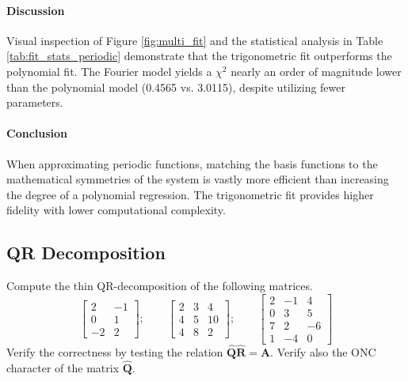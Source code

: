 \begin{solution}
	\paragraph{Discussion}
	Visual inspection of Figure \ref{fig:multi_fit} and the statistical analysis
	in Table \ref{tab:fit_stats_periodic} demonstrate that the trigonometric fit
	outperforms the polynomial fit. The Fourier model yields a $\chi^2$ nearly an
	order of magnitude lower than the polynomial model (0.4565 vs. 3.0115), despite
	utilizing fewer parameters.

	\paragraph{Conclusion}
	When approximating periodic functions, matching the basis functions to the
	mathematical symmetries of the system is vastly more efficient than increasing
	the degree of a polynomial regression. The trigonometric fit provides higher
	fidelity with lower computational complexity.

\end{solution}

\subsection{QR Decomposition}

\begin{exercise}
	Compute the thin QR-decomposition of the following matrices.
	\[
		\begin{bmatrix}
			2  & -1 \\
			0  & 1  \\
			-2 & 2
		\end{bmatrix};
		\qquad
		\begin{bmatrix}
			2 & 3 & 4  \\
			4 & 5 & 10 \\
			4 & 8 & 2
		\end{bmatrix};
		\qquad
		\begin{bmatrix}
			2 & -1 & 4  \\
			0 & 3  & 5  \\
			7 & 2  & -6 \\
			1 & -4 & 0
		\end{bmatrix}
	\]
	Verify the correctness by testing the relation
	$\hat{\mathbf{Q}}\hat{\mathbf{R}}={\mathbf{A}}$. Verify also the ONC
	character of the matrix $\hat{\mathbf{Q}}$.
\end{exercise}

